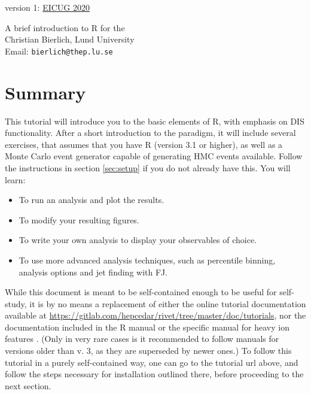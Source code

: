 \documentclass[11pt]{article}
\newcommand{\rivet}{R\protect\scalebox{0.8}{IVET}\xspace}
\newcommand{\hepmc}{H\protect\scalebox{0.8}{EP}MC\xspace}
\newcommand{\eic}{\protect\scalebox{0.8}{EIC}\xspace}
\newcommand{\fastjet}{F\protect\scalebox{0.8}{AST}J\protect\scalebox{0.8}{ET}\xspace}
\begin{document}
\begin{flushright}
version 1: \href{https://indico.bnl.gov/event/9153/}{EICUG 2020}\\
\end{flushright}
\vspace*{1cm}
\begin{center}
  \LARGE A brief introduction to \rivet for the \eic
	\normalsize\\[8mm]
	Christian Bierlich, Lund University\\ Email: \texttt{bierlich@thep.lu.se}
\end{center}

\tableofcontents

\section{Summary}
This tutorial will introduce you to the basic elements of \rivet, with emphasis on DIS functionality. After a short introduction to the paradigm, it will include several exercises, that assumes
that you have \rivet \cite{Bierlich:2019rhm} (version 3.1 or higher), as well as a Monte Carlo event generator capable of generating \hepmc events available. Follow the instructions in section \ref{sec:setup} if you do not already have this. You will learn:

\begin{itemize}
	\item To run an analysis and plot the results.
	\item To modify your resulting figures.
	\item To write your own analysis to display your observables of choice.
	\item To use more advanced analysis techniques, such as percentile binning, analysis options and jet finding with \fastjet \cite{Cacciari:2011ma}.
\end{itemize}
While this document is meant to be self-contained enough to be useful for self-study, it is by no means a replacement of either the online tutorial documentation available
at \url{https://gitlab.com/hepcedar/rivet/tree/master/doc/tutorials}, nor the documentation included in the \rivet manual \cite{Bierlich:2019rhm} or the specific manual for heavy ion features \cite{Bierlich:2020wms}. (Only in very rare cases is it recommended to follow manuals for versions older than v. 3, as they are superseded by newer ones.) To follow this tutorial in a purely self-contained way, one can go to the tutorial url above, and follow the steps necessary for installation outlined there, before proceeding to the next section.
\end{document}
